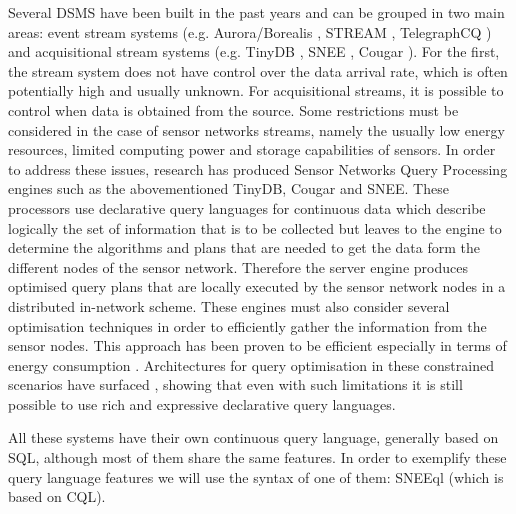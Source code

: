 Several DSMS have been built in the past years and can be grouped in two main areas: event stream systems (e.g. Aurora/Borealis \cite{Abadi_2005}, STREAM \cite{Arasu_06a}, TelegraphCQ \cite{Chandrasekaran_03}) and acquisitional stream systems (e.g. TinyDB \cite{Madden_05}, SNEE \cite{Galpin_09}, Cougar \cite{Yao_02}). For the first, the stream system does not have control over the data arrival rate, which is often potentially high and usually unknown. For acquisitional streams, it is possible to control when data is obtained from the source.
Some restrictions must be considered in the case of sensor networks streams, namely the usually low energy resources, limited computing power and storage capabilities of sensors. In order to address these issues, research has produced Sensor Networks Query Processing engines such as the abovementioned TinyDB, Cougar and SNEE.
These processors use declarative query languages for continuous data which describe logically the set of information that is to be collected but leaves to the engine to determine the algorithms and plans that are needed to get the data form the different nodes of the sensor network. Therefore the server engine produces optimised query plans that are locally executed by the sensor network nodes in a distributed in-network scheme. These engines must also consider several optimisation techniques in order to efficiently gather the information from the sensor nodes. This approach has been proven to be efficient especially in terms of energy consumption \cite{Madden_05}. Architectures for query optimisation in these constrained scenarios have surfaced \cite{Galpin_09,Madden_05}, showing that even with such limitations it is still possible to use rich and expressive declarative query languages.

All these systems have their own continuous query language, generally based on SQL, although most of them share the
same features.
In order to exemplify these query language features we will use the syntax of one of them: SNEEql
\cite{Brenninkmeijer_08} (which is based on CQL).
%
%

